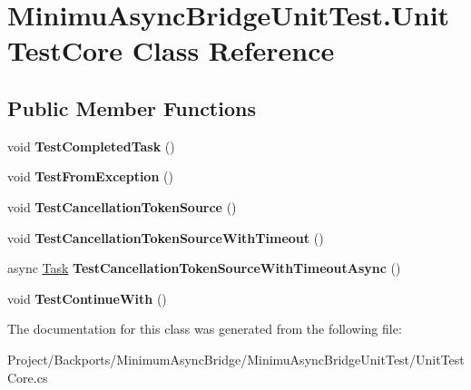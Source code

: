 \hypertarget{class_minimu_async_bridge_unit_test_1_1_unit_test_core}{}\section{Minimu\+Async\+Bridge\+Unit\+Test.\+Unit\+Test\+Core Class Reference}
\label{class_minimu_async_bridge_unit_test_1_1_unit_test_core}
\subsection*{Public Member Functions}
\begin{DoxyCompactItemize}
\item 
\mbox{\label{class_minimu_async_bridge_unit_test_1_1_unit_test_core_af93a5a76c0c3dee841fed71921802542}} 
void {\bfseries Test\+Completed\+Task} ()
\item 
\mbox{\label{class_minimu_async_bridge_unit_test_1_1_unit_test_core_a239f3574cb7588879aca72d8544f8019}} 
void {\bfseries Test\+From\+Exception} ()
\item 
\mbox{\label{class_minimu_async_bridge_unit_test_1_1_unit_test_core_a350471a3a6646906121c7fffde204e09}} 
void {\bfseries Test\+Cancellation\+Token\+Source} ()
\item 
\mbox{\label{class_minimu_async_bridge_unit_test_1_1_unit_test_core_a235a1fa932dc49bb4576afa898b20950}} 
void {\bfseries Test\+Cancellation\+Token\+Source\+With\+Timeout} ()
\item 
\mbox{\label{class_minimu_async_bridge_unit_test_1_1_unit_test_core_ac62554c081770a6814d5506c25c8f6f4}} 
async \hyperlink{class_system_1_1_threading_1_1_tasks_1_1_task}{Task} {\bfseries Test\+Cancellation\+Token\+Source\+With\+Timeout\+Async} ()
\item 
\mbox{\label{class_minimu_async_bridge_unit_test_1_1_unit_test_core_a3cb73ac5ded3505901b1b9f4ae801b6b}} 
void {\bfseries Test\+Continue\+With} ()
\end{DoxyCompactItemize}


The documentation for this class was generated from the following file\+:\begin{DoxyCompactItemize}
\item 
Project/\+Backports/\+Minimum\+Async\+Bridge/\+Minimu\+Async\+Bridge\+Unit\+Test/Unit\+Test\+Core.\+cs\end{DoxyCompactItemize}
